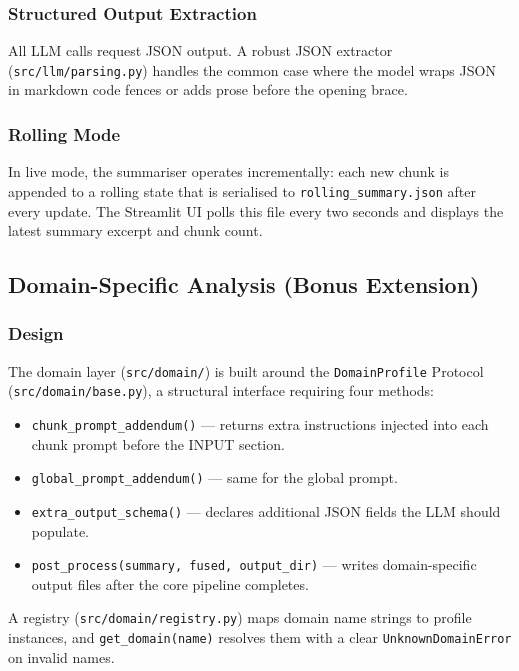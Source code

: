 \documentclass[12pt,a4paper]{article}
\begin{document}
\subsubsection{Structured Output Extraction}
All LLM calls request JSON output. A robust JSON extractor
(\texttt{src/llm/parsing.py}) handles the common case where the model wraps JSON in
markdown code fences or adds prose before the opening brace.

\subsubsection{Rolling Mode}
In live mode, the summariser operates incrementally: each new chunk is appended to a
rolling state that is serialised to \texttt{rolling\_summary.json} after every update.
The Streamlit UI polls this file every two seconds and displays the latest summary
excerpt and chunk count.

\subsection{Domain-Specific Analysis (Bonus Extension)}
\label{subsec:domain}

\subsubsection{Design}
The domain layer (\texttt{src/domain/}) is built around the \texttt{DomainProfile}
Protocol (\texttt{src/domain/base.py}), a structural interface requiring four methods:
\begin{itemize}[leftmargin=*]
  \item \texttt{chunk\_prompt\_addendum()} — returns extra instructions injected into
    each chunk prompt before the INPUT section.
  \item \texttt{global\_prompt\_addendum()} — same for the global prompt.
  \item \texttt{extra\_output\_schema()} — declares additional JSON fields the LLM
    should populate.
  \item \texttt{post\_process(summary, fused, output\_dir)} — writes domain-specific
    output files after the core pipeline completes.
\end{itemize}

A registry (\texttt{src/domain/registry.py}) maps domain name strings to profile
instances, and \texttt{get\_domain(name)} resolves them with a clear
\texttt{UnknownDomainError} on invalid names.
\end{document}
